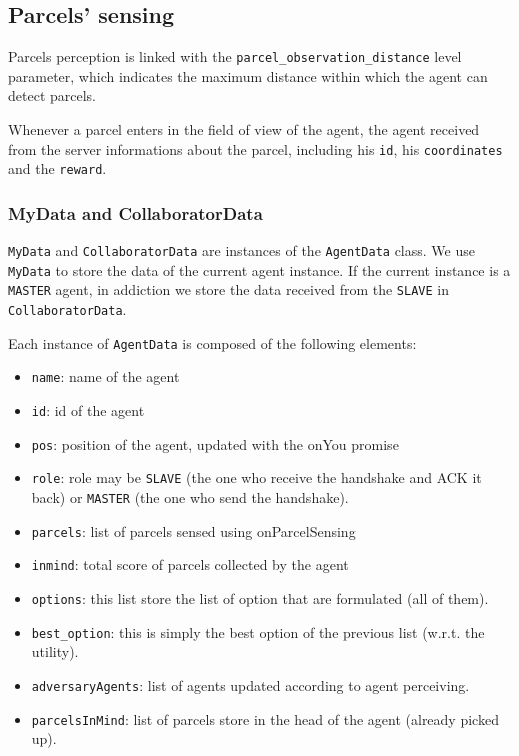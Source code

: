 \documentclass[10pt]{article}
\begin{document}
\subsection{Parcels' sensing}

Parcels perception is linked with the \texttt{parcel\_observation\_distance} level parameter, which indicates the maximum distance within which the agent can detect parcels. 

Whenever a parcel enters in the field of view of the agent, the agent received from the server informations about the parcel, including his \texttt{id}, his \texttt{coordinates} and the \texttt{reward}.    

\subsubsection{MyData and CollaboratorData}

\texttt{MyData} and \texttt{CollaboratorData} are instances of the \texttt{AgentData} class. We use \texttt{MyData} to store the data of the current agent instance. If the current instance is a \texttt{MASTER} agent, in addiction we store the data received from the \texttt{SLAVE} in \texttt{CollaboratorData}.

Each instance of \texttt{AgentData} is composed of the following elements:

\begin{itemize}
    \item \texttt{name}: name of the agent
    \item \texttt{id}: id of the agent
    \item \texttt{pos}: position of the agent, updated with the onYou promise
    \item \texttt{role}: role may be \texttt{SLAVE} (the one who receive the handshake and ACK it back) or \texttt{MASTER} (the one who send the handshake). 
    \item \texttt{parcels}: list of parcels sensed using onParcelSensing
    \item \texttt{inmind}: total score of parcels collected by the agent
    \item \texttt{options}: this list store the list of option that are formulated (all of them).
    \item \texttt{best\_option}: this is simply the best option of the previous list (w.r.t. the utility).
    \item \texttt{adversaryAgents}: list of agents updated according to agent perceiving. 
    \item \texttt{parcelsInMind}: list of parcels store in the head of the agent (already picked up).
\end{itemize}
\end{document}
